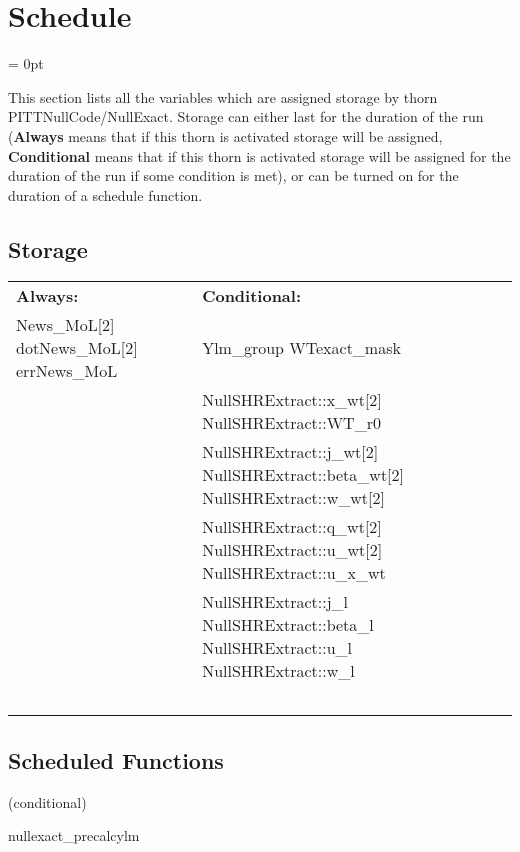 
\section{Schedule} 


\parskip = 0pt


\noindent This section lists all the variables which are assigned storage by thorn PITTNullCode/NullExact.  Storage can either last for the duration of the run ({\bf Always} means that if this thorn is activated storage will be assigned, {\bf Conditional} means that if this thorn is activated storage will be assigned for the duration of the run if some condition is met), or can be turned on for the duration of a schedule function.


\subsection*{Storage}

\hspace{5mm}

 \begin{tabular*}{160mm}{ll} 

{\bf Always:}& {\bf Conditional:} \\ 
 News\_MoL[2] dotNews\_MoL[2] errNews\_MoL &  Ylm\_group WTexact\_mask\\ 
~ &  NullSHRExtract::x\_wt[2] NullSHRExtract::WT\_r0\\ 
~ &  NullSHRExtract::j\_wt[2] NullSHRExtract::beta\_wt[2] NullSHRExtract::w\_wt[2]\\ 
~ &  NullSHRExtract::q\_wt[2] NullSHRExtract::u\_wt[2] NullSHRExtract::u\_x\_wt\\ 
~ &  NullSHRExtract::j\_l NullSHRExtract::beta\_l NullSHRExtract::u\_l NullSHRExtract::w\_l\\ 
~ & ~\\ 
\end{tabular*} 


\subsection*{Scheduled Functions}
\vspace{5mm}

   (conditional) 

\hspace{5mm} nullexact\_precalcylm 

\hspace{5mm}{\it precalculate spherical harmonics } 


